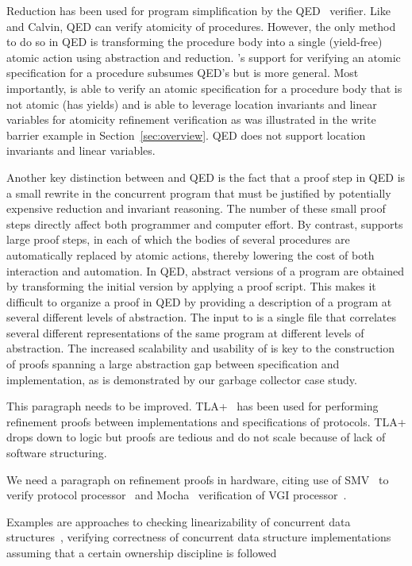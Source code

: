 Reduction has been used for program simplification by the
QED~\cite{ElmasQT09} verifier.
Like \civl and Calvin, QED can verify atomicity of procedures. However,
the only method to do so in QED is transforming the procedure body
into a single (yield-free) atomic action using abstraction and reduction. \civl's
support for verifying an atomic specification for a procedure subsumes
QED's but is more general. Most importantly, \civl is able to verify
an atomic specification for a procedure body that is not atomic (has
yields) and is able to leverage location invariants and linear
variables for atomicity
refinement verification as was illustrated in the write barrier
example in Section~\ref{sec:overview}. QED does not support location invariants and linear variables. 

Another key distinction between \civl and QED is the fact that a proof step in QED is a small rewrite in the concurrent program
that must be justified by potentially expensive reduction and invariant reasoning.
The number of these small proof steps directly affect both programmer
and computer effort. 
By contrast, \civl supports large proof steps, in each of which the bodies of several procedures
are automatically replaced by atomic actions, thereby lowering the cost of both interaction and automation.
In QED, abstract versions of a program are obtained by transforming the initial
version by applying a proof script. 
This makes it difficult to organize a proof in QED by providing a
description of a program at several different levels of abstraction. 
The input to \civl is a single file that correlates several different
representations of the same program at different levels of
abstraction. 
The increased scalability and usability of \civl is key to the construction of proofs spanning a large abstraction gap
between specification and implementation, as is demonstrated by our
garbage collector case study. 

This paragraph needs to be improved.
TLA+~\cite{Lamport2004} has been used for performing refinement proofs between implementations and specifications of protocols.
TLA+ drops down to logic but proofs are tedious and do not scale because of lack of software structuring.

We need a paragraph on refinement proofs in hardware, citing use of SMV~\cite{McMillan00} to verify protocol processor~\cite{Eiriksson2000} 
and Mocha~\cite{AlurHMQRT98} verification of VGI processor~\cite{Henzinger1999}.

Examples are approaches to
checking linearizability of concurrent data
structures~\cite{tacasLin,aliLin}, 
verifying correctness of
concurrent data structure implementations assuming that a certain
ownership discipline is followed~\cite{TuronM11} 

